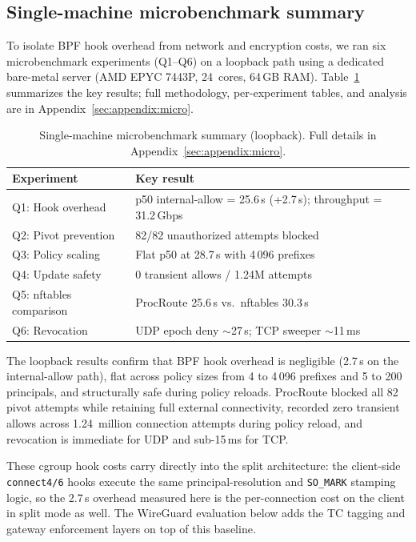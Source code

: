 \documentclass[sigconf]{acmart}
\begin{document}
\subsection{Single-machine microbenchmark summary}
\label{sec:eval:micro-summary}

To isolate BPF hook overhead from network and encryption
costs, we ran six microbenchmark experiments (Q1--Q6) on a
loopback path using a dedicated bare-metal server (AMD EPYC
7443P, 24~cores,
64\,GB RAM).
Table~\ref{tab:micro-summary} summarizes the key results; full
methodology, per-experiment tables, and analysis are in
Appendix~\ref{sec:appendix:micro}.

\begin{table}[t]
\centering
\caption{Single-machine microbenchmark summary (loopback).
  Full details in Appendix~\ref{sec:appendix:micro}.}
\label{tab:micro-summary}
\begin{tabular}{p{3.2cm} p{4.4cm}}
\toprule
Experiment & Key result \\
\midrule
Q1: Hook overhead
  & p50 internal-allow = 25.6\,\textmu{}s (+2.7\,\textmu{}s);
    throughput = 31.2\,Gbps \\
Q2: Pivot prevention
  & 82/82 unauthorized attempts blocked \\
Q3: Policy scaling
  & Flat p50 at 28.7\,\textmu{}s with 4\,096 prefixes \\
Q4: Update safety
  & 0 transient allows / 1.24M attempts \\
Q5: nftables comparison
  & ProcRoute 25.6\,\textmu{}s vs.\ nftables 30.3\,\textmu{}s \\
Q6: Revocation
  & UDP epoch deny $\sim$27\,\textmu{}s; TCP sweeper $\sim$11\,ms \\
\bottomrule
\end{tabular}
\end{table}

The loopback results confirm that BPF hook overhead is negligible
(2.7\,\textmu{}s on the internal-allow path), flat across policy
sizes from 4 to 4\,096 prefixes and 5 to 200 principals, and
structurally safe during policy reloads.
ProcRoute blocked all 82 pivot attempts while retaining full
external connectivity, recorded zero transient allows across
1.24~million connection attempts during policy reload, and
revocation is immediate for UDP and sub-15\,ms for TCP.

These cgroup hook costs carry directly into the split
architecture: the client-side \texttt{connect4/6} hooks execute
the same principal-resolution and \texttt{SO\_MARK} stamping
logic, so the 2.7\,\textmu{}s overhead measured here is the
per-connection cost on the client in split mode as well.
The WireGuard evaluation below adds the TC tagging and gateway
enforcement layers on top of this baseline.
\end{document}

